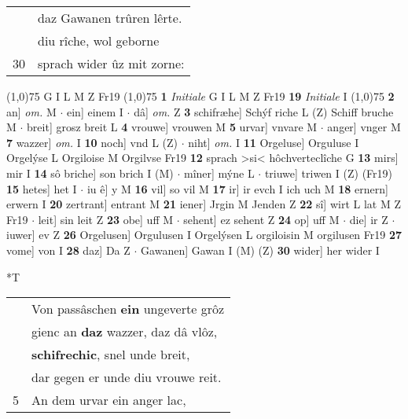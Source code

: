 \documentclass[8pt,a4paper,notitlepage]{article}
\begin{document}
\begin{table}[ht]
\begin{minipage}[t]{0.5\linewidth}
\begin{tabular}{rl}
 & daz Gawanen trûren lêrte.\\ 
 & diu rîche, wol geborne\\ 
30 & sprach wider ûz mit zorne:\\ 
\end{tabular}
\scriptsize
\line(1,0){75} \newline
G I L M Z Fr19 \newline
\line(1,0){75} \newline
\textbf{1} \textit{Initiale} G I L M Z Fr19  \textbf{19} \textit{Initiale} I  \newline
\line(1,0){75} \newline
\textbf{2} an] \textit{om.} M  $\cdot$ ein] einem I  $\cdot$ dâ] \textit{om.} Z \textbf{3} schifræhe] Schýf riche L (Z) Schiff bruche M  $\cdot$ breit] grosz breit L \textbf{4} vrouwe] vrouwen M \textbf{5} urvar] vnvare M  $\cdot$ anger] vnger M \textbf{7} wazzer] \textit{om.} I \textbf{10} noch] vnd L (Z)  $\cdot$ niht] \textit{om.} I \textbf{11} Orgeluse] Orguluse I Orgelýse L Orgiloise M Orgilvse Fr19 \textbf{12} sprach >si< hôchverteclîche G \textbf{13} mirs] mir I \textbf{14} sô briche] son brich I (M)  $\cdot$ mîner] mýne L  $\cdot$ triuwe] triwen I (Z) (Fr19) \textbf{15} hetes] het I  $\cdot$ iu ê] y M \textbf{16} vil] so vil M \textbf{17} ir] ir evch I ich uch M \textbf{18} ernern] erwern I \textbf{20} zertrant] entrant M \textbf{21} iener] Jrgin M Jenden Z \textbf{22} sî] wirt L lat M Z Fr19  $\cdot$ leit] sin leit Z \textbf{23} obe] uff M  $\cdot$ sehent] ez sehent Z \textbf{24} op] uff M  $\cdot$ die] ir Z  $\cdot$ iuwer] ev Z \textbf{26} Orgelusen] Orgulusen I Orgelýsen L orgiloisin M orgilusen Fr19 \textbf{27} vome] von I \textbf{28} daz] Da Z  $\cdot$ Gawanen] Gawan I (M) (Z) \textbf{30} wider] her wider I \newline
\end{minipage}
\hspace{0.5cm}
\begin{minipage}[t]{0.5\linewidth}
\small
\begin{center}*T
\end{center}
\begin{tabular}{rl}
 & Von passâschen \textbf{ein} ungeverte grôz\\ 
 & gienc an \textbf{daz} wazzer, daz dâ vlôz,\\ 
 & \textbf{schifrechic}, snel unde breit,\\ 
 & dar gegen er unde diu vrouwe reit.\\ 
5 & An dem urvar ein anger lac,\\ 

\end{tabular}
\end{minipage}
\end{table}
\end{document}
